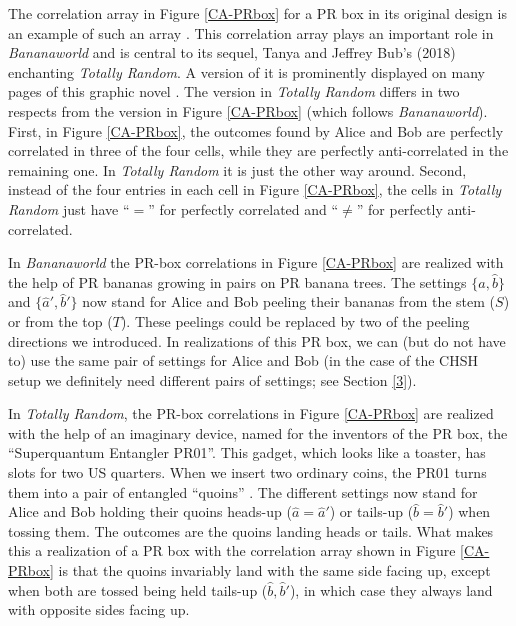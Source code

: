The correlation array  in Figure \ref{CA-PRbox} for a PR box in its original design is an example of such an array \citep[p.\ 89, Table 4.2; we switched Alice and Bob to match the convention that the index labeling the rows of a matrix comes before the index labeling its columns]{Bub 2016}. This correlation array plays an important role in \emph{Bananaworld} and is central to its sequel, Tanya and Jeffrey Bub's (2018) enchanting \emph{Totally Random}. A version of it is prominently displayed on many pages of this graphic novel \citep[pp.\ 15, 21, 33, 95, 115, 181, 200 and 227]{Bub and Bub 2018}. The version in \emph{Totally Random} differs in two respects from the version in Figure \ref{CA-PRbox} (which follows \emph{Bananaworld}). First, in Figure \ref{CA-PRbox}, the outcomes found by Alice and Bob are perfectly correlated in three of the four cells, while they are perfectly anti-correlated in the remaining one. In \emph{Totally Random} it is just the other way around. Second, instead of the four entries in each cell in Figure \ref{CA-PRbox}, the cells in \emph{Totally Random} just have ``$=$'' for perfectly correlated and ``$\neq$'' for perfectly anti-correlated. 

In \emph{Bananaworld} the PR-box correlations in Figure \ref{CA-PRbox} are realized with the help of PR bananas growing in pairs on PR banana trees. The settings $\{\hat{a}, \hat{b}\}$ and $\{\hat{a}', \hat{b}'\}$ now stand for Alice and Bob peeling their bananas from the stem ($S$) or from the top ($T$). These peelings could be replaced by two of the peeling directions we introduced. In realizations of this PR box, we can (but do not have to) use the same pair of settings for Alice and Bob (in the case of the CHSH setup we definitely need different pairs of settings; see Section \ref{3}).  

In \emph{Totally Random}, the PR-box correlations  in Figure \ref{CA-PRbox}  are realized with the help of an imaginary device, named for the inventors of the PR box, the ``Superquantum Entangler PR01''. This gadget, which looks like a toaster, has slots for two US quarters. When we insert two ordinary coins, the PR01 turns them into a pair of entangled ``quoins'' \citep[p.\ 7]{Bub and Bub 2018}. The different settings now stand for Alice and Bob holding their quoins heads-up ($\hat{a} = \hat{a}'$) or tails-up ($\hat{b} = \hat{b}'$) when tossing them. The outcomes are the quoins landing heads or tails. What makes this a realization of a PR box with the correlation array shown in Figure \ref{CA-PRbox} is that the quoins invariably land with the same side facing up, except when both are tossed being held tails-up ($\hat{b}, \hat{b}'$), in which case they always land with opposite sides facing up. 

